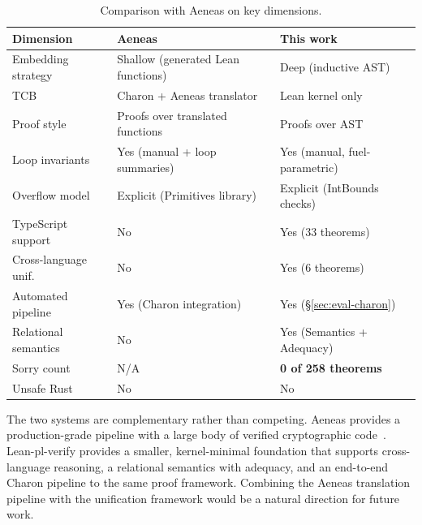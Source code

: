 \begin{table}[t]
\centering
\caption{Comparison with Aeneas on key dimensions.}
\label{tab:comparison2}
\small
\begin{tabular}{@{}lll@{}}
\toprule
\textbf{Dimension} & \textbf{Aeneas~\cite{ho2022aeneas}} & \textbf{This work} \\
\midrule
Embedding strategy    & Shallow (generated Lean functions) & Deep (inductive AST) \\
TCB                   & Charon + Aeneas translator         & Lean kernel only \\
Proof style           & Proofs over translated functions   & Proofs over AST \\
Loop invariants       & Yes (manual + loop summaries)      & Yes (manual, fuel-parametric) \\
Overflow model        & Explicit (Primitives library)      & Explicit (IntBounds checks) \\
TypeScript support    & No                                 & Yes (33 theorems) \\
Cross-language unif.  & No                                 & Yes (6 theorems) \\
Automated pipeline    & Yes (Charon integration)           & Yes (\S\ref{sec:eval-charon}) \\
Relational semantics  & No                                 & Yes (Semantics + Adequacy) \\
Sorry count           & N/A                                & \textbf{0 of 258 theorems} \\
Unsafe Rust           & No                                 & No \\
\bottomrule
\end{tabular}
\end{table}

The two systems are complementary rather than competing. Aeneas provides a
production-grade pipeline with a large body of verified cryptographic
code~\cite{aeneascrypto2026}. Lean-pl-verify provides a smaller,
kernel-minimal foundation that supports cross-language reasoning, a
relational semantics with adequacy, and an end-to-end Charon pipeline
to the same proof framework.
Combining the Aeneas translation pipeline with the \ProgramSpec unification
framework would be a natural direction for future work.
